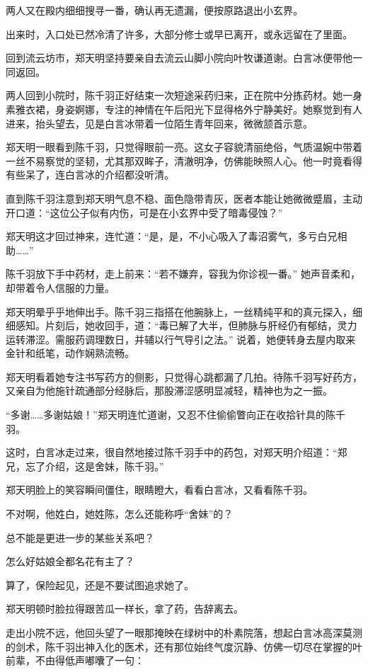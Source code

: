两人又在殿内细细搜寻一番，确认再无遗漏，便按原路退出小玄界。

出来时，入口处已然冷清了许多，大部分修士或早已离开，或永远留在了里面。

\vspace{2em}

回到流云坊市，郑天明坚持要亲自去流云山脚小院向叶牧谦道谢。白言冰便带他一同返回。

两人回到小院时，陈千羽正好结束一次短途采药归来，正在院中分拣药材。她一身素雅衣裙，身姿婀娜，专注的神情在午后阳光下显得格外宁静美好。她察觉到有人进来，抬头望去，见是白言冰带着一位陌生青年回来，微微颔首示意。

郑天明一眼看到陈千羽，只觉得眼前一亮。这女子容貌清丽绝俗，气质温婉中带着一丝不易察觉的坚韧，尤其那双眸子，清澈明净，仿佛能映照人心。他一时竟看得有些呆了，连白言冰的介绍都没听清。

直到陈千羽注意到郑天明气息不稳、面色隐带青灰，医者本能让她微微蹙眉，主动开口道：“这位公子似有内伤，可是在小玄界中受了暗毒侵蚀？”

郑天明这才回过神来，连忙道：“是，是，不小心吸入了毒沼雾气，多亏白兄相助……”

陈千羽放下手中药材，走上前来：“若不嫌弃，容我为你诊视一番。” 她声音柔和，却带着令人信服的力量。

郑天明晕乎乎地伸出手。陈千羽三指搭在他腕脉上，一丝精纯平和的真元探入，细细感知。片刻后，她收回手，道：“毒已解了大半，但肺脉与肝经仍有郁结，灵力运转滞涩。需服药调理数日，并辅以行气导引之法。” 说着，她便转身去屋内取来金针和纸笔，动作娴熟流畅。

郑天明看着她专注书写药方的侧影，只觉得心跳都漏了几拍。待陈千羽写好药方，又亲自为他施针疏通部分经脉后，那股滞涩感明显减轻，精神也为之一振。

“多谢……多谢姑娘！”郑天明连忙道谢，又忍不住偷偷瞥向正在收拾针具的陈千羽。

这时，白言冰走过来，很自然地接过陈千羽手中的药包，对郑天明介绍道：“郑兄，忘了介绍，这是舍妹，陈千羽。”

郑天明脸上的笑容瞬间僵住，眼睛瞪大，看看白言冰，又看看陈千羽。

不对啊，他姓白，她姓陈，怎么还能称呼“舍妹”的？

总不能是更进一步的某些关系吧？

怎么好姑娘全都名花有主了？

算了，保险起见，还是不要试图追求她了。

郑天明顿时脸拉得跟苦瓜一样长，拿了药，告辞离去。

走出小院不远，他回头望了一眼那掩映在绿树中的朴素院落，想起白言冰高深莫测的剑术，陈千羽出神入化的医术，还有那位始终气度沉静、仿佛一切尽在掌握的叶前辈，不由得低声嘟囔了一句：


